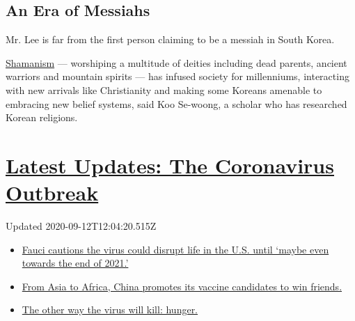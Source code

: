 \hypertarget{an-era-of-messiahs}{%
\subsection{An Era of Messiahs}\label{an-era-of-messiahs}}

Mr. Lee is far from the first person claiming to be a messiah in South
Korea.

\href{https://www.nytimes3xbfgragh.onion/2007/07/07/world/asia/07korea.html}{Shamanism}
--- worshiping a multitude of deities including dead parents, ancient
warriors and mountain spirits --- has infused society for millenniums,
interacting with new arrivals like Christianity and making some Koreans
amenable to embracing new belief systems, said Koo Se-woong, a scholar
who has researched Korean religions.

\hypertarget{latest-updates-the-coronavirus-outbreak}{%
\section{\texorpdfstring{\href{https://www.nytimes3xbfgragh.onion/2020/09/11/world/covid-19-coronavirus.html?action=click\&pgtype=Article\&state=default\&region=MAIN_CONTENT_1\&context=storylines_live_updates}{Latest
Updates: The Coronavirus
Outbreak}}{Latest Updates: The Coronavirus Outbreak}}\label{latest-updates-the-coronavirus-outbreak}}

Updated 2020-09-12T12:04:20.515Z

\begin{itemize}
\tightlist
\item
  \href{https://www.nytimes3xbfgragh.onion/2020/09/11/world/covid-19-coronavirus.html?action=click\&pgtype=Article\&state=default\&region=MAIN_CONTENT_1\&context=storylines_live_updates\#link-dfb8a16}{Fauci
  cautions the virus could disrupt life in the U.S. until `maybe even
  towards the end of 2021.'}
\item
  \href{https://www.nytimes3xbfgragh.onion/2020/09/11/world/covid-19-coronavirus.html?action=click\&pgtype=Article\&state=default\&region=MAIN_CONTENT_1\&context=storylines_live_updates\#link-7104d154}{From
  Asia to Africa, China promotes its vaccine candidates to win friends.}
\item
  \href{https://www.nytimes3xbfgragh.onion/2020/09/11/world/covid-19-coronavirus.html?action=click\&pgtype=Article\&state=default\&region=MAIN_CONTENT_1\&context=storylines_live_updates\#link-393ad215}{The
  other way the virus will kill: hunger.}
\end{itemize}


